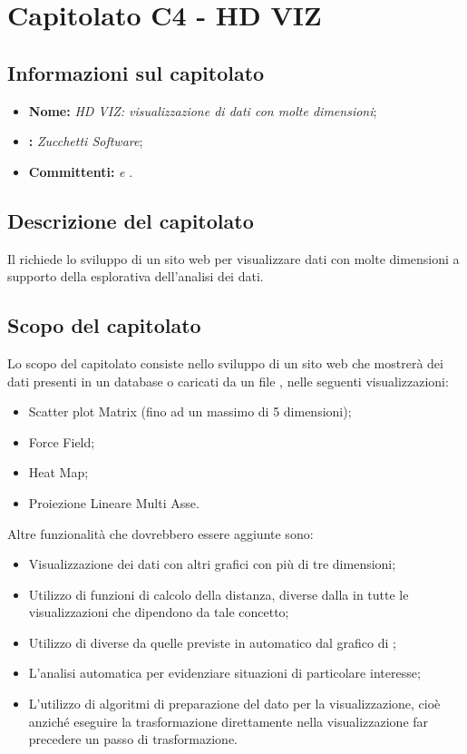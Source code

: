 \section{Capitolato C4 - HD VIZ}\label{C4}
\subsection{Informazioni sul capitolato}
\begin{itemize}
	\item \textbf{Nome:} \textit{HD VIZ: visualizzazione di dati con molte dimensioni};
	\item \textbf{:} \textit{Zucchetti Software};
	\item \textbf{Committenti:} \textit{\VT{} e \CR{}}.
\end{itemize}

\subsection{Descrizione del capitolato}
Il  richiede lo sviluppo di un sito web per visualizzare dati con molte dimensioni a supporto della  esplorativa dell'analisi dei dati.

\subsection{Scopo del capitolato}
Lo scopo del capitolato consiste nello sviluppo di un sito web che mostrerà dei dati presenti in un database o caricati da un file , nelle seguenti visualizzazioni:
\begin{itemize}
	\item Scatter plot Matrix (fino ad un massimo di 5 dimensioni);
	\item Force Field;
	\item Heat Map;
	\item Proiezione Lineare Multi Asse.
\end{itemize}
Altre funzionalità che dovrebbero essere aggiunte sono:
\begin{itemize}
	\item Visualizzazione dei dati con altri grafici con più di tre dimensioni;
	\item Utilizzo di funzioni di calcolo della distanza, diverse dalla  in tutte le visualizzazioni che dipendono da tale concetto;
	\item Utilizzo di  diverse da quelle previste in automatico dal grafico  di \textit{};
	\item L'analisi automatica per evidenziare situazioni di particolare interesse;
	\item L'utilizzo di algoritmi di preparazione del dato per la visualizzazione, cioè anziché eseguire la trasformazione direttamente nella visualizzazione far precedere un passo di trasformazione.
\end{itemize}

